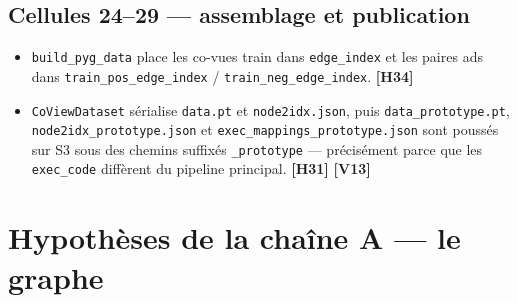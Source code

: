 \documentclass[11pt,a4paper]{article}
\newcommand{\code}[1]{\texttt{\small #1}}
\newcommand{\hyp}[1]{\textcolor{hypcol}{\textbf{\small [#1]}}}
\begin{document}
\subsection*{Cellules 24--29 --- assemblage et publication}
\begin{itemize}[nosep,leftmargin=*]
  \item \code{build\_pyg\_data} place les co-vues train dans \code{edge\_index} et les
        paires ads dans \code{train\_pos\_edge\_index} /
        \code{train\_neg\_edge\_index}. \hyp{H34}
  \item \code{CoViewDataset} sérialise \code{data.pt} et \code{node2idx.json}, puis
        \code{data\_prototype.pt}, \code{node2idx\_prototype.json} et
        \code{exec\_mappings\_prototype.json} sont poussés sur S3 sous des chemins
        suffixés \code{\_prototype} --- précisément parce que les \code{exec\_code}
        diffèrent du pipeline principal. \hyp{H31} \hyp{V13}
\end{itemize}

\clearpage
\section{Hypothèses de la chaîne A --- le graphe}
\label{sec:hyp-a}
\end{document}

